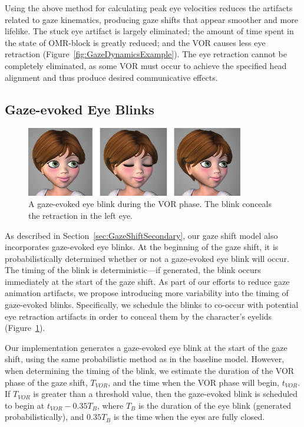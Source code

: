Using the above method for calculating peak eye velocities reduces the artifacts related to gaze kinematics, producing gaze shifts that appear smoother and more lifelike. The stuck eye artifact is largely eliminated; the amount of time spent in the state of OMR-block is greatly reduced; and the VOR causes less eye retraction (Figure~\ref{fig:GazeDynamicsExample}). The eye retraction cannot be completely eliminated, as some VOR must occur to achieve the specified head alignment and thus produce desired communicative effects.

\subsection{Gaze-evoked Eye Blinks}

\begin{figure}
\centering
\includegraphics[width=0.85\textwidth]{stylizedgaze/Figures/GazeEvokedBlinkVOR-small.pdf}
\caption{A gaze-evoked eye blink during the VOR phase. The blink conceals the retraction in the left eye.}
\label{fig:GazeEvokedBlinkVOR}
\end{figure}

As described in Section~\ref{sec:GazeShiftSecondary}, our gaze shift model also incorporates gaze-evoked eye blinks. At the beginning of the gaze shift, it is probabilistically determined whether or not a gaze-evoked eye blink will occur.
The timing of the blink is deterministic---if generated, the blink occurs immediately at the start of the gaze shift.
As part of our efforts to reduce gaze animation artifacts, we propose introducing more variability into the timing of gaze-evoked blinks. Specifically, we schedule the blinks to co-occur with potential eye retraction artifacts in order to conceal them by the character's eyelids (Figure~\ref{fig:GazeEvokedBlinkVOR}).

Our implementation generates a gaze-evoked eye blink at the start of the gaze shift, using the same probabilistic method as in the baseline model. However, when determining the timing of the blink, we estimate the duration of the VOR phase of the gaze shift, $T_{VOR}$, and the time when the VOR phase will begin, $t_{VOR}$. If $T_{VOR}$ is greater than a threshold value, then the gaze-evoked blink is scheduled to begin at $t_{VOR} - 0.35T_{B}$, where $T_B$ is the duration of the eye blink (generated probabilistically), and $0.35T_B$ is the time when the eyes are fully closed.
